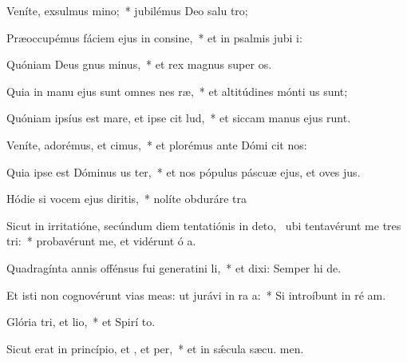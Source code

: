 \item Veníte, exsulmus mino;~* jubilémus Deo salu tro;
\item Præoccupémus fáciem ejus in consine,~* et in psalmis jubi i:
\item Quóniam Deus gnus minus,~* et rex magnus super  os.
\item Quia in manu ejus sunt omnes nes ræ,~* et altitúdines mónti us sunt;
\item Quóniam ipsíus est mare, et ipse cit lud,~* et siccam manus ejus runt.
\item Veníte, adorémus, et cimus,~* et plorémus ante Dómi  cit nos:
\item Quia ipse est Dóminus us ter,~* et nos pópulus páscuæ ejus, et oves  jus.
\item Hódie si vocem ejus diritis,~* nolíte obduráre  tra
\item Sicut in irritatióne, secúndum diem tentatiónis in deto,~\pscross{} ubi tentavérunt me tres tri:~* probavérunt me, et vidérunt ó a.
\item Quadragínta annis offénsus fui generatini li,~* et dixi: Semper hi  de.
\item Et isti non cognovérunt vias meas: ut jurávi in ra a:~* Si introíbunt in ré am.
\item Glória tri, et lio,~* et Spirí to.
\item Sicut erat in princípio, et , et per,~* et in sǽcula sæcu. men.

